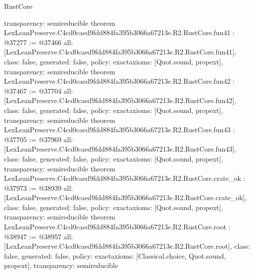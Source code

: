 \begin{lexlean}{RustCore}
\begin{coremodule}
{  transparency: semireducible
}
theorem LexLeanPreserve.C4cd0caed9fdd884fa395b3066a67213e.R2.RustCore.fun41 : @37277 := @37466 {
  all: [LexLeanPreserve.C4cd0caed9fdd884fa395b3066a67213e.R2.RustCore.fun41],
  class: false,
  generated: false,
  policy: exact{axioms: [Quot.sound, propext]},
  transparency: semireducible
}
theorem LexLeanPreserve.C4cd0caed9fdd884fa395b3066a67213e.R2.RustCore.fun42 : @37467 := @37704 {
  all: [LexLeanPreserve.C4cd0caed9fdd884fa395b3066a67213e.R2.RustCore.fun42],
  class: false,
  generated: false,
  policy: exact{axioms: [Quot.sound, propext]},
  transparency: semireducible
}
theorem LexLeanPreserve.C4cd0caed9fdd884fa395b3066a67213e.R2.RustCore.fun43 : @37705 := @37969 {
  all: [LexLeanPreserve.C4cd0caed9fdd884fa395b3066a67213e.R2.RustCore.fun43],
  class: false,
  generated: false,
  policy: exact{axioms: [Quot.sound, propext]},
  transparency: semireducible
}
theorem LexLeanPreserve.C4cd0caed9fdd884fa395b3066a67213e.R2.RustCore.crate_ok : @37973 := @38939 {
  all: [LexLeanPreserve.C4cd0caed9fdd884fa395b3066a67213e.R2.RustCore.crate_ok],
  class: false,
  generated: false,
  policy: exact{axioms: [Quot.sound, propext]},
  transparency: semireducible
}
theorem LexLeanPreserve.C4cd0caed9fdd884fa395b3066a67213e.R2.RustCore.root : @38947 := @38957 {
  all: [LexLeanPreserve.C4cd0caed9fdd884fa395b3066a67213e.R2.RustCore.root],
  class: false,
  generated: false,
  policy: exact{axioms: [Classical.choice, Quot.sound, propext]},
  transparency: semireducible
}


\end{coremodule}
\end{lexlean}
